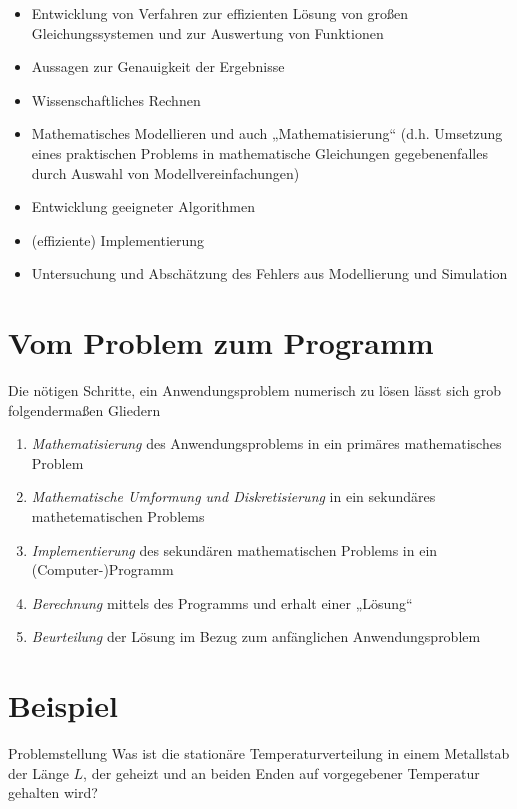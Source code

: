 \documentclass{mycourse}
\begin{document}
\begin{itemize}
\item Entwicklung von Verfahren zur effizienten Lösung von großen Gleichungssystemen
und zur Auswertung von Funktionen
\item Aussagen zur Genauigkeit der Ergebnisse
\item Wissenschaftliches Rechnen
\item Mathematisches Modellieren und auch „Mathematisierung“ 
	(d.h. Umsetzung eines praktischen Problems in mathematische Gleichungen gegebenenfalles durch Auswahl von Modellvereinfachungen)
\item Entwicklung geeigneter Algorithmen
\item (effiziente) Implementierung
\item Untersuchung und Abschätzung des Fehlers aus Modellierung und Simulation
\end{itemize}

\section{Vom Problem zum Programm}

Die nötigen Schritte, ein Anwendungsproblem numerisch zu lösen lässt sich grob folgendermaßen Gliedern

\begin{enumerate}
	\item \emph{Mathematisierung} des Anwendungsproblems in ein primäres mathematisches Problem
	\item \emph{Mathematische Umformung und Diskretisierung} in ein sekundäres mathetematischen Problems
	\item \emph{Implementierung} des sekundären mathematischen Problems in ein (Computer-)Programm
	\item \emph{Berechnung} mittels des Programms und erhalt einer „Lösung“
	\item \emph{Beurteilung} der Lösung im Bezug zum anfänglichen Anwendungsproblem
\end{enumerate}

\section{Beispiel}

\begin{seg}{Problemstellung}
Was ist die stationäre Temperaturverteilung in einem Metallstab der Länge $L$, der geheizt
und an beiden Enden auf vorgegebener Temperatur gehalten wird?
\end{seg}
\end{document}
